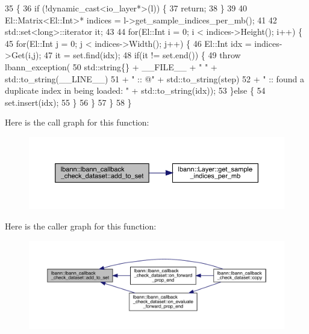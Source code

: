 \begin{DoxyCode}
35                                                                                                  \{
36   \textcolor{keywordflow}{if} (!dynamic\_cast<io\_layer*>(l)) \{
37     \textcolor{keywordflow}{return};
38   \}
39 
40   El::Matrix<El::Int>* indices = l->get\_sample\_indices\_per\_mb();
41 
42   std::set<long>::iterator it;
43 
44   \textcolor{keywordflow}{for}(El::Int i = 0; i < indices->Height(); i++) \{
45     \textcolor{keywordflow}{for}(El::Int j = 0; j < indices->Width(); j++) \{
46       El::Int idx = indices->Get(i,j);
47       it = \textcolor{keyword}{set}.find(idx);
48       \textcolor{keywordflow}{if}(it != \textcolor{keyword}{set}.end()) \{
49         \textcolor{keywordflow}{throw} lbann\_exception(
50           std::string\{\} + \_\_FILE\_\_ + \textcolor{stringliteral}{" "} + std::to\_string(\_\_LINE\_\_)
51           + \textcolor{stringliteral}{" :: @"} + std::to\_string(step)
52           + \textcolor{stringliteral}{" :: found a duplicate index in being loaded: "} + std::to\_string(idx));
53       \}\textcolor{keywordflow}{else} \{
54         \textcolor{keyword}{set}.insert(idx);
55       \}
56     \}
57   \}
58 \}
\end{DoxyCode}
Here is the call graph for this function\+:\nopagebreak
\begin{figure}[H]
\begin{center}
\leavevmode
\includegraphics[width=350pt]{classlbann_1_1lbann__callback__check__dataset_a17aff74d9926e07bfa1f090ad39bb4b6_cgraph}
\end{center}
\end{figure}
Here is the caller graph for this function\+:\nopagebreak
\begin{figure}[H]
\begin{center}
\leavevmode
\includegraphics[width=350pt]{classlbann_1_1lbann__callback__check__dataset_a17aff74d9926e07bfa1f090ad39bb4b6_icgraph}
\end{center}
\end{figure}
\mbox{\label{classlbann_1_1lbann__callback__check__dataset_a8be592f1687aea003986c874dc5f7516}} 
